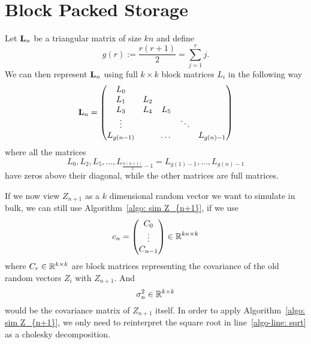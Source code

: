 \section{Block Packed Storage}\label{sec: memory layout}

Let \(\mathbf{L}_n\) be a triangular matrix of size \(kn\) and define
\[
	g(r):= \frac{r(r+1)}2 = \sum_{j=1}^r j.
\]
We can then represent \(\mathbf{L}_n\) using full \(k\times k\) block matrices
\(L_i\) in the following way
\[
	\mathbf{L}_n = \begin{pmatrix}
		L_0 & \\
		L_1 & L_2 \\
		L_3 & L_4 & L_5 \\
		\vdots & & & \ddots \\
		L_{g(n-1)} & & \dots & & L_{g(n) -1}
	\end{pmatrix}
\]
where all the matrices
\[
	L_0,L_2,L_5,\dots, L_{\frac{n(n+1)}2-1} = L_{g(1)-1}, \dots, L_{g(n)-1}
\]
have zeros above their diagonal, while the other matrices are full matrices.

If we now view \(Z_{n+1}\) as a \(k\) dimensional random vector we want to
simulate in bulk, we can still use Algorithm~\ref{algo: sim Z_{n+1}}, if we
use
\[
	c_n = \begin{pmatrix}
		C_0\\
		\vdots\\
		C_{n-1}	
	\end{pmatrix} \in \mathbb{R}^{kn\times k}
\]
where \(C_r\in\mathbb{R}^{k\times k}\) are block matrices representing the covariance
of the old random vectors \(Z_i\) with \(Z_{n+1}\). And
\[
	\sigma_n^2 \in \mathbb{R}^{k\times k}
\]
would be the covariance matrix of \(Z_{n+1}\) itself. In order to apply
Algorithm~\ref{algo: sim Z_{n+1}}, we only need to reinterpret the square root in
line~\ref{algo-line: sqrt} as a cholesky decomposition.

